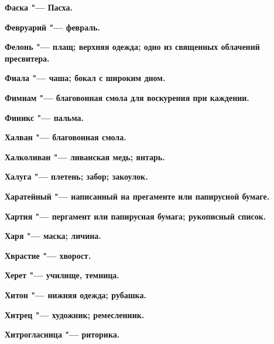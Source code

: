 \bfseries Фаска \normalfont{} "--- Пасха. 




\bfseries Февруарий \normalfont{} "--- февраль. 




\bfseries Фелонь \normalfont{} "--- плащ; верхняя одежда; одно из священных облачений пресвитера. 




\bfseries Фиала \normalfont{} "--- чаша; бокал с широким дном. 




\bfseries Фимиам \normalfont{} "--- благовонная смола для воскурения при каждении. 




\bfseries Финикс \normalfont{} "--- пальма. 




 





\bfseries Халван \normalfont{} "--- благовонная смола. 




\bfseries Халколиван \normalfont{} "--- ливанская медь; янтарь. 




\bfseries Халуга \normalfont{} "--- плетень; забор; закоулок. 




\bfseries Харатейный \normalfont{} "--- написанный на прегаменте или папирусной бумаге. 




\bfseries Хартия \normalfont{} "--- пергамент или папирусная бумага; рукописный список. 




\bfseries Харя \normalfont{} "--- маска; личина. 




\bfseries Хврастие \normalfont{} "--- хворост. 




\bfseries Херет \normalfont{} "--- училище, темница. 




\bfseries Хитон \normalfont{} "--- нижняя одежда; рубашка. 




\bfseries Хитрец \normalfont{} "--- художник; ремесленник. 




\bfseries Хитрогласница \normalfont{} "--- риторика. 





